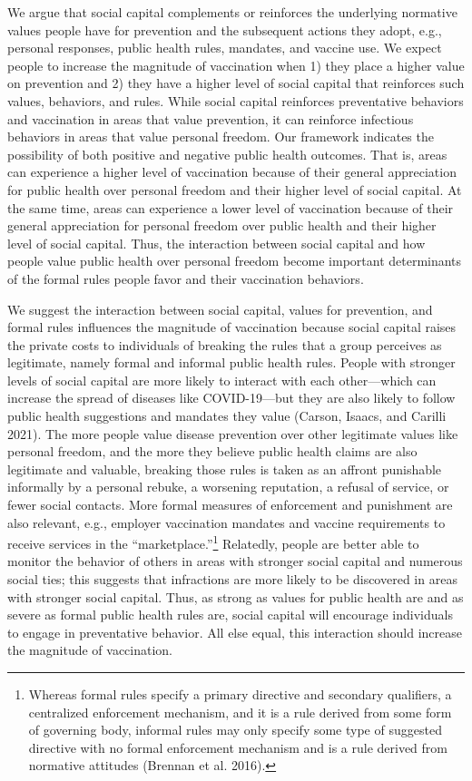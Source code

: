 \documentclass[
]{article}
\begin{document}
We argue that social capital complements or reinforces the underlying
normative values people have for prevention and the subsequent actions
they adopt, e.g., personal responses, public health rules, mandates, and
vaccine use. We expect people to increase the magnitude of vaccination
when 1) they place a higher value on prevention and 2) they have a
higher level of social capital that reinforces such values, behaviors,
and rules. While social capital reinforces preventative behaviors and
vaccination in areas that value prevention, it can reinforce infectious
behaviors in areas that value personal freedom. Our framework indicates
the possibility of both positive and negative public health outcomes.
That is, areas can experience a higher level of vaccination because of
their general appreciation for public health over personal freedom and
their higher level of social capital. At the same time, areas can
experience a lower level of vaccination because of their general
appreciation for personal freedom over public health and their higher
level of social capital. Thus, the interaction between social capital
and how people value public health over personal freedom become
important determinants of the formal rules people favor and their
vaccination behaviors.

We suggest the interaction between social capital, values for
prevention, and formal rules influences the magnitude of vaccination
because social capital raises the private costs to individuals of
breaking the rules that a group perceives as legitimate, namely formal
and informal public health rules. People with stronger levels of social
capital are more likely to interact with each other---which can increase
the spread of diseases like COVID-19---but they are also likely to
follow public health suggestions and mandates they value (Carson,
Isaacs, and Carilli 2021). The more people value disease prevention over
other legitimate values like personal freedom, and the more they believe
public health claims are also legitimate and valuable, breaking those
rules is taken as an affront punishable informally by a personal rebuke,
a worsening reputation, a refusal of service, or fewer social contacts.
More formal measures of enforcement and punishment are also relevant,
e.g., employer vaccination mandates and vaccine requirements to receive
services in the ``marketplace.''\footnote{Whereas formal rules specify a
  primary directive and secondary qualifiers, a centralized enforcement
  mechanism, and it is a rule derived from some form of governing body,
  informal rules may only specify some type of suggested directive with
  no formal enforcement mechanism and is a rule derived from normative
  attitudes (Brennan et al. 2016).} Relatedly, people are better able to
monitor the behavior of others in areas with stronger social capital and
numerous social ties; this suggests that infractions are more likely to
be discovered in areas with stronger social capital. Thus, as strong as
values for public health are and as severe as formal public health rules
are, social capital will encourage individuals to engage in preventative
behavior. All else equal, this interaction should increase the magnitude
of vaccination.
\end{document}
